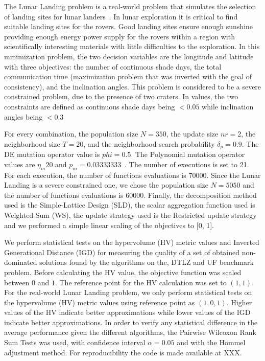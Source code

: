 The Lunar Landing problem is a real-world problem that simulates the selection of landing sites for lunar landers~\citep{MoonOrbitingSatellite2015}. In lunar exploration it is critical to find suitable landing sites for the rovers. Good landing sites ensure enough sunshine providing enough energy power supply for the rovers within a region with scientifically interesting materials with little difficulties to the exploration. In this minimization problem, the two decision variables are the longitude and latitude with three objectives: the number of continuous shade days, the total communication time (maximization problem that was inverted with the goal of consistency), and the inclination angles. This problem is considered to be a severe constrained problem, due to the presence of two craters. In values, the two constraints are defined as continuous shade days being $ < 0.05$ while inclination angles being $<0.3$



For every combination, the population size $N = 350$, the update size $nr = 2$, the neighborhood size $T = 20$, and the neighborhood search probability $\delta_p = 0.9$. The DE mutation operator value is $phi=0.5$. The Polynomial mutation operator values are $\eta_m 20$ and $p_m = 0.03333333$~\cite{campelo2018moeadr}. The number of executions is set to 21. For each execution, the number of functions evaluations is 70000. Since the Lunar Landing is a severe constrained one, we chose the population size $N = 5050$ and the number of functions evaluations is 60000. Finally, the decomposition method used is the Simple-Lattice Design (SLD), the scalar aggregation function used is Weighted Sum (WS), the update strategy used is the Restricted update strategy and we performed a simple linear scaling of the objectives to [0, 1].


We perform statistical tests on the hypervolume (HV) metric values and Inverted Generational Distance (IGD) for measuring the quality of a set of obtained non-dominated solutions found by the algorithms on the, DTLZ and UF benchmark problem. Before calculating the HV value, the objective function was scaled between $0$ and $1$. The reference point for the HV calculation was set to $(1, 1)$. For the real-world Lunar Landing problem, we only perform statistical tests on the hypervolume (HV) metric values using reference point as $(1, 0, 1)$. Higher values of the HV indicate better approximations while lower values of the IGD indicate better approximations. In order to verify any statistical difference in the average performance given the different algorithms, the Pairwise Wilcoxon Rank Sum Tests was used, with confidence interval $\alpha = 0.05$ and with the Hommel adjustment method. For reproducibility the code is made available at XXX.

